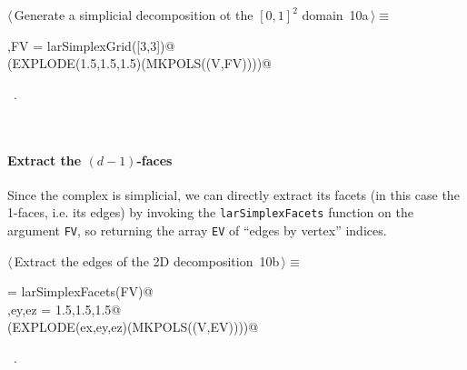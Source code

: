 \documentclass[11pt,oneside]{article}	%
\begin{document}
\begin{flushleft} \small
\begin{minipage}{\linewidth} \label{scrap11}
\protect{}$\langle\,$Generate a simplicial decomposition ot the $[0,1]^2$ domain\nobreak\ {\footnotesize 10a}$\,\rangle\equiv$
\vspace{-1ex}
\begin{list}{}{} \item
\mbox{}\verb@V,FV = larSimplexGrid([3,3])@\\
\mbox{}\verb@VIEW(EXPLODE(1.5,1.5,1.5)(MKPOLS((V,FV))))@\\
\mbox{}\verb@@{\NWsep}
\end{list}
\vspace{-1ex}
\footnotesize\addtolength{\baselineskip}{-1ex}
\begin{list}{}{\setlength{\itemsep}{-\parsep}\setlength{\itemindent}{-\leftmargin}}
\item \NWtxtMacroRefIn\ .
\end{list}
\end{minipage}\\[4ex]
\end{flushleft}
\paragraph{Extract the $(d-1)$-faces}
Since the complex is simplicial, we can directly extract its facets (in this case the 1-faces, i.e. its edges) by invoking the \texttt{larSimplexFacets} function on the argument \texttt{FV}, so returning the array \texttt{EV} of ``edges by vertex'' indices. 

\begin{flushleft} \small
\begin{minipage}{\linewidth} \label{scrap12}
\protect{}$\langle\,$Extract the edges of the 2D decomposition\nobreak\ {\footnotesize 10b}$\,\rangle\equiv$
\vspace{-1ex}
\begin{list}{}{} \item
\mbox{}\verb@EV = larSimplexFacets(FV)@\\
\mbox{}\verb@ex,ey,ez = 1.5,1.5,1.5@\\
\mbox{}\verb@VIEW(EXPLODE(ex,ey,ez)(MKPOLS((V,EV))))@\\
\mbox{}\verb@@{\NWsep}
\end{list}
\vspace{-1ex}
\footnotesize\addtolength{\baselineskip}{-1ex}
\begin{list}{}{\setlength{\itemsep}{-\parsep}\setlength{\itemindent}{-\leftmargin}}
\item \NWtxtMacroRefIn\ .
\end{list}
\end{minipage}\\[4ex]
\end{flushleft}
\end{document}
